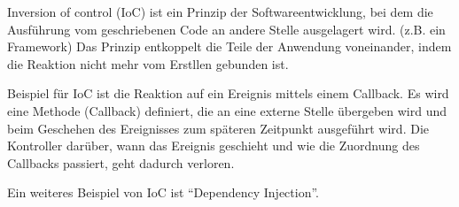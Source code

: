 Inversion of control (IoC) ist ein Prinzip der Softwareentwicklung, 
bei dem die Ausführung vom geschriebenen Code an andere Stelle ausgelagert wird.
(z.B. ein Framework)
Das Prinzip entkoppelt die Teile der Anwendung voneinander, indem die Reaktion nicht mehr vom 
Erstllen gebunden ist.

Beispiel für IoC ist die Reaktion auf ein Ereignis mittels einem Callback. 
Es wird eine Methode (Callback) definiert, die an eine externe Stelle übergeben wird und 
beim Geschehen des Ereignisses zum späteren Zeitpunkt ausgeführt wird. 
Die Kontroller darüber, wann das Ereignis geschieht und wie die Zuordnung des Callbacks passiert, geht dadurch verloren. 

Ein weiteres Beispiel von IoC ist ``Dependency Injection''.